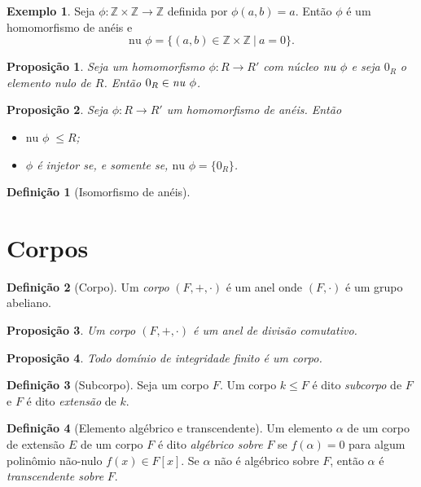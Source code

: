 \documentclass[a4paper,12pt]{report}
\theoremstyle{plain}
\newtheorem{proposicao}{Proposição}[section]
\theoremstyle{definition}
\newtheorem{definicao}{Definição}[section]
\newtheorem{exemplo}{Exemplo}[section]
\begin{document}
\begin{exemplo}
	Seja $\phi: \mathbb{Z}\times \mathbb{Z} \longrightarrow \mathbb{Z}$ definida por $\phi(a,b) = a$. Então $\phi$ é um homomorfismo de anéis e
	$$\text{nu }\phi = \{(a,b) \in \mathbb{Z}\times \mathbb{Z} \ | \ a = 0\}.$$
\end{exemplo}

\begin{proposicao}
	Seja um homomorfismo $\phi:R\longrightarrow R'$ com núcleo $\text{\emph{nu} }\phi$ e seja $0_R$ o elemento nulo de $R$. Então $0_R \in \text{\emph{nu} }\phi$.
\end{proposicao}

\begin{proposicao}
	Seja $\phi: R \longrightarrow R'$ um homomorfismo de anéis. Então 
	\begin{itemize}
		\item $\text{nu } \phi\; \leq R$;
		\item $\phi$ é injetor se, e somente se, $\text{nu }\phi = \{0_R\}$.
	\end{itemize}
\end{proposicao}

\begin{definicao}[Isomorfismo de anéis]
	 
\end{definicao}


\section{Corpos}

\begin{definicao}[Corpo]
	Um \emph{corpo} $(F,+,\cdot)$ é um anel onde $(F,\cdot)$ é um grupo abeliano.
\end{definicao}

\begin{proposicao}
	Um corpo $(F, +, \cdot)$ é um anel de divisão comutativo.
\end{proposicao}

\begin{proposicao}
	Todo domínio de integridade finito é um corpo.
\end{proposicao}

\begin{definicao}[Subcorpo]
	Seja um corpo $F$. Um corpo $k\leq F$ é dito \emph{subcorpo} de $F$ e $F$ é dito \emph{extensão} de $k$.
\end{definicao}

\begin{definicao}[Elemento algébrico e transcendente]
	Um elemento $\alpha$ de um corpo de extensão $E$ de um corpo $F$ é dito \emph{algébrico sobre} $F$ se $f(\alpha) = 0$ para algum polinômio não-nulo $f(x) \in F[x]$. Se $\alpha$ não é algébrico sobre $F$, então $\alpha$ é \emph{transcendente sobre} $F$.
\end{definicao}
\end{document}
